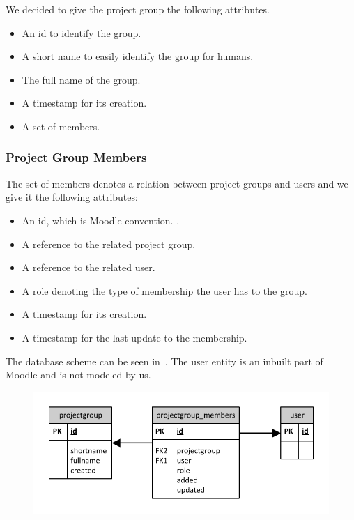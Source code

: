 We decided to give the project group the following attributes. 
\begin{itemize}
	\item An id to identify the group. 
	\item A short name to easily identify the group for humans. 
	\item The full name of the group. 
	\item A timestamp for its creation. 
	\item A set of members. 
\end{itemize}

\subsubsection{Project Group Members}
The set of members denotes a relation between project groups and users and we give it the following attributes: 
\begin{itemize}
	\item An id, which is Moodle convention. \cite{moodledb}.
	\item A reference to the related project group.
	\item A reference to the related user.
	\item A role denoting the type of membership the user has to the group.
	\item A timestamp for its creation.
	\item A timestamp for the last update to the membership. 
\end{itemize}
The database scheme can be seen in~. 
The user entity is an inbuilt part of Moodle and is not modeled by us. 
\begin{figure}
	\centering
		\includegraphics{images/projectgroupsdb.pdf}
	\label{fig:projectgroupsdb}
\end{figure}


